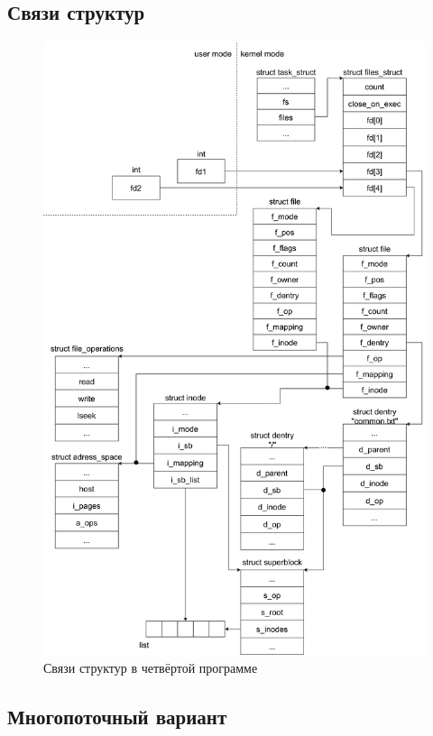 \documentclass[a4paper,14pt]{extarticle}
\begin{document}
\newpage
\subsection{Связи структур}

\begin{figure}[H]
	\centering
	\includegraphics[height=0.91\textheight]{img/structures-4.drawio.png}
	\caption{Связи структур в четвёртой программе}
\end{figure}

\subsection{Многопоточный вариант}
\end{document}
